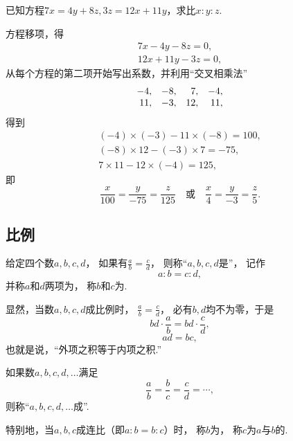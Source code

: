 \begin{example}
已知方程\(7x=4y+8z, 3z=12x+11y\)，求比\(x:y:z\).
\begin{solution}
方程移项，得\begin{gather*}
	7x-4y-8z=0, \\
	12x+11y-3z=0,
\end{gather*}
从每个方程的第二项开始写出系数，并利用“交叉相乘法”
\begin{equation*}
	\begin{array}{*4r}
		-4, & -8, & 7, & -4, \\
		11, & -3, & 12, & 11,
	\end{array}
\end{equation*}
得到\begin{gather*}
	(-4)\times(-3)-11\times(-8)=100, \\
	(-8)\times12-(-3)\times7=-75, \\
	7\times11-12\times(-4)=125,
\end{gather*}
即\begin{equation*}
	\frac{x}{100}=\frac{y}{-75}=\frac{z}{125}
	\quad\text{或}\quad
	\frac{x}{4}=\frac{y}{-3}=\frac{z}{5}.
\end{equation*}
\end{solution}
\end{example}

\subsection{比例}
\begin{definition}
给定四个数\(a,b,c,d\)，
如果有\(\frac{a}{b}=\frac{c}{d}\)，
则称“\(a,b,c,d\)是”，
记作\begin{equation*}
	a:b = c:d,
\end{equation*}
并称\(a\)和\(d\)两项为，
称\(b\)和\(c\)为.
\end{definition}

显然，当数\(a,b,c,d\)成比例时，
\(\frac{a}{b}=\frac{c}{d}\)，
必有\(b,d\)均不为零，于是\begin{equation*}
	bd \cdot \frac{a}{b} = bd \cdot \frac{c}{d},
\end{equation*}\begin{equation*}
	ad = bc,
\end{equation*}
也就是说，“外项之积等于内项之积.”

\begin{definition}
如果数\(a,b,c,d,\dotsc\)满足\begin{equation*}
	\frac{a}{b} = \frac{b}{c} = \frac{c}{d} = \dotsb,
\end{equation*}
则称“\(a,b,c,d,\dotsc\)成”.

特别地，当\(a,b,c\)成连比（即\(a:b = b:c\)）时，
称\(b\)为，
称\(c\)为\(a\)与\(b\)的.
\end{definition}

